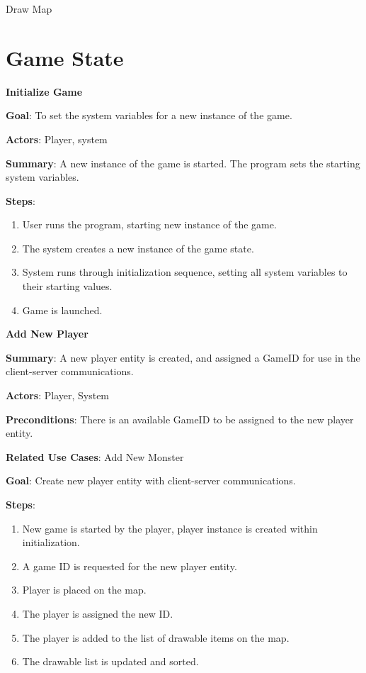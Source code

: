 \documentclass[12pt]{report}
\begin{document}
\begin{subsection}{Draw Map}
\section{Game State}

\textbf{Initialize Game}

\textbf{Goal}: 
To set the system variables for a new instance of the game.

\textbf{Actors}: 
Player, system

\textbf{Summary}: 
A new instance of the game is started. The program sets the starting system variables.

\textbf{Steps}:
\begin{enumerate}
	\item User runs the program, starting new instance of the game.
	\item The system creates a new instance of the game state.
	\item System runs through initialization sequence, setting all system variables to their starting values.
	\item Game is launched.
\end{enumerate}

\textbf{Add New Player}

\textbf{Summary}: 
A new player entity is created, and assigned a GameID for use in the client-server communications.

\textbf{Actors}: 
Player, System

\textbf{Preconditions}: 
There is an available GameID to be assigned to the new player entity.

\textbf{Related Use Cases}: 
Add New Monster

\textbf{Goal}:
Create new player entity with client-server communications.



\textbf{Steps}:
\begin{enumerate}
	\item New game is started by the player, player instance is created within initialization.
	\item A game ID is requested for the new player entity.
	\item Player is placed on the map.
	\item The player is assigned the new ID.
	\item The player is added to the list of drawable items on the map.
	\item The drawable list is updated and sorted.
\end{enumerate}


\end{subsection}
\end{document}
